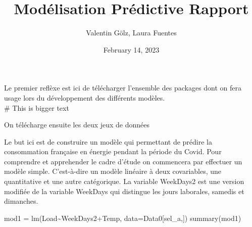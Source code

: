 \documentclass[
]{article}
\title{Modélisation Prédictive Rapport}
\author{Valentin Gölz, Laura Fuentes}
\date{February 14, 2023}
\newenvironment{Shaded}{\begin{snugshade}}{\end{snugshade}}
\newcommand{\AttributeTok}[1]{\textcolor[rgb]{0.77,0.63,0.00}{#1}}
\newcommand{\DecValTok}[1]{\textcolor[rgb]{0.00,0.00,0.81}{#1}}
\newcommand{\FunctionTok}[1]{\textcolor[rgb]{0.00,0.00,0.00}{#1}}
\newcommand{\NormalTok}[1]{#1}
\newcommand{\OtherTok}[1]{\textcolor[rgb]{0.56,0.35,0.01}{#1}}
\newcommand{\SpecialCharTok}[1]{\textcolor[rgb]{0.00,0.00,0.00}{#1}}
\newcommand{\StringTok}[1]{\textcolor[rgb]{0.31,0.60,0.02}{#1}}
\begin{document}
\maketitle

Le premier reflèxe est ici de télécharger l'ensemble des packages dont
on fera usage lors du développement des différents modèles.\\
\# This is bigger text

On télécharge ensuite les deux jeux de données

\begin{Shaded}
\end{Shaded}

Le but ici est de construire un modèle qui permettant de prédire la
consommation française en énergie pendant la période du Covid. Pour
comprendre et apprehender le cadre d'étude on commencera par effectuer
un modèle simple. C'est-à-dire un modèle linéaire à deux covariables,
une quantitative et une autre catégorique. La variable WeekDays2 est une
version modifiée de la variable WeekDays qui distingue les jours
laborales, samedis et dimanches.

\begin{Shaded}
\begin{Highlighting}[]
\NormalTok{mod1 }\OtherTok{=} \FunctionTok{lm}\NormalTok{(Load}\SpecialCharTok{\textasciitilde{}}\NormalTok{WeekDays2}\SpecialCharTok{+}\NormalTok{Temp, }\AttributeTok{data=}\NormalTok{Data0[sel\_a,])}
\FunctionTok{summary}\NormalTok{(mod1)}
\end{Highlighting}
\end{Shaded}
\end{document}
